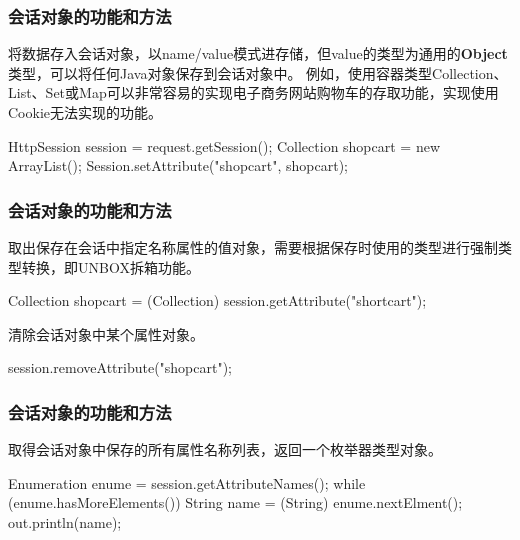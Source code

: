 \begin{frame}[fragile] %
\frametitle{会话对象的功能和方法} 


将数据存入会话对象，以name/value模式进存储，但value的类型为通用的{\bf Object}类型，可以将任何Java对象保存到会话对象中。
{\kai 例如，使用容器类型Collection、List、Set或Map可以非常容易的实现电子商务网站购物车的存取功能，实现使用Cookie无法实现的功能。}

\begin{javaCode}
HttpSession session = request.getSession();
Collection shopcart = new ArrayList();
Session.setAttribute("shopcart", shopcart);
\end{javaCode}
\end{frame}

\begin{frame}[fragile] %
\frametitle{会话对象的功能和方法} 


取出保存在会话中指定名称属性的值对象，需要根据保存时使用的类型进行{\hei\Blue 强制类型转换}，即UNBOX拆箱功能。

\begin{javaCode}
Collection shopcart = (Collection) session.getAttribute("shortcart");
\end{javaCode}


清除会话对象中某个属性对象。

\begin{javaCode}
session.removeAttribute("shopcart");
\end{javaCode}
\end{frame}

\begin{frame}[fragile] %
\frametitle{会话对象的功能和方法} 


取得会话对象中保存的所有属性名称列表，返回一个枚举器类型对象。
\begin{javaCode}
Enumeration enume = session.getAttributeNames();
while (enume.hasMoreElements()) {
  String name = (String) enume.nextElment();
  out.println(name);
}
\end{javaCode}
\end{frame}

